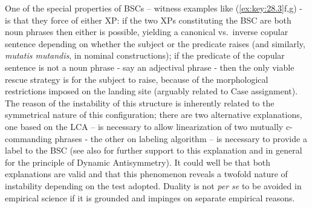 \documentclass[output=paper]{langsci/langscibook}
\begin{document}
One of the special properties of \glspl{BSC} – witness
examples like (\ref{ex:key:28.3}f,g)
- is that they force  of either XP: if the two XPs constituting the \gls{BSC}
are both noun phrases then either  is possible, yielding a canonical
vs.\ inverse copular sentence depending on whether the subject or the predicate
raises (and similarly, \emph{mutatis mutandis}, in nominal constructions); if
the predicate of the copular sentence is not a noun phrase - say an adjectival
phrase - then the only viable rescue strategy is for the subject to raise,
because of the morphological restrictions imposed on the landing site (arguably
related to Case assignment). The reason of the instability of this structure is
inherently related to the symmetrical nature of this configuration; there are
two alternative explanations, one based on the \gls{LCA} \citep{Moro2000} – 
is necessary to allow linearization of two mutually c-commanding phrases - the
other on labeling algorithm \citep{Moro2009} –  is necessary to provide
a label to the \gls{BSC} (see also
\citealt{Moro2000,Moro2009,Chomsky2013,Chomsky2017,ChoGalOtt2019,Rizzi2015,Rizzi2016}
for further support to this explanation and in general for the principle of
Dynamic Antisymmetry). It could well be that both explanations are valid and
that this phenomenon reveals a twofold nature of instability depending on the
test adopted. Duality is not \emph{per se} to be avoided in empirical science
if it is grounded and impinges on separate empirical reasons.
\end{document}
